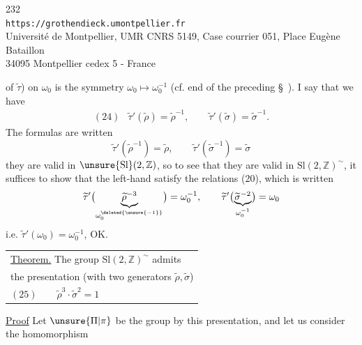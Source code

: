 
\begin{center}
232\\
\texttt{https://grothendieck.umontpellier.fr}\\
Université de Montpellier, UMR CNRS 5149, Case courrier 051, Place Eugène Bataillon\\
34095 Montpellier cedex 5 - France
\end{center}


of $\widetilde\tau$) on $\omega_0$ is the symmetry $\omega_0\mapsto\omega_0^{-1}$ (cf. end of the preceding \S\ ). I say that we have
\[
\begin{array}{ll}
(24)&\widetilde\tau'(\widetilde\rho)=\widetilde\rho^{-1},\qquad
\widetilde\tau'(\widetilde\sigma)=\widetilde\sigma^{-1}.
\end{array}
\]
The formulas are  written
\[
\widetilde\tau'(\widetilde\rho^{-1})=\widetilde\rho,\qquad
\widetilde\tau'(\widetilde\sigma^{-1})=\widetilde\sigma
\]
they are valid  in $\unsure{\mathrm{Sl}}(2,\mathbb Z)$, so to see that they are valid in $\mathrm{Sl}(2,\mathbb Z)^{\sim}$, it suffices to show that the left-hand  satisfy the  relations (20), which is written
\[
\widetilde\tau'\bigl(\underbrace{\widetilde\rho^{-3}}_{\omega_0^{\deleted{\unsure{-1}}}}\bigr)=\omega_0^{-1},\qquad
\widetilde\tau'\bigl(\underbrace{\widetilde\sigma^{-2}}_{\omega_0^{-1}}\bigr)=\omega_0
\]
i.e. $\widetilde\tau'(\omega_0)=\omega_0^{-1}$, OK.

\begin{tabular}{|l}
\uline{Theorem.} The group $\mathrm{Sl}(2,\mathbb Z)^{\sim}$ admits\\
the presentation (with two generators $\widetilde\rho,\widetilde\sigma$)\\[3pt]
$(25)\qquad\boxed{\widetilde\rho^3\cdot\widetilde\sigma^2=1}$
\end{tabular}

\uline{Proof} Let $\unsure{\Pi|\pi}$ be the group   by this presentation, and let us consider the homomorphism

